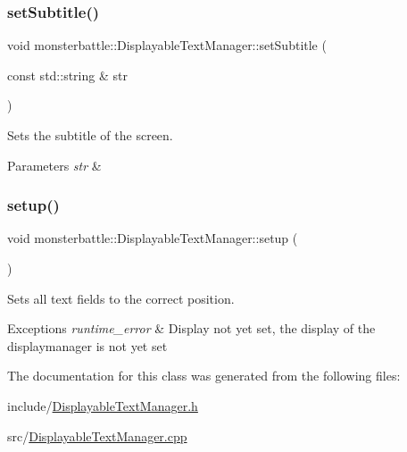 \subsubsection{\texorpdfstring{set\+Subtitle()}{setSubtitle()}}
{\footnotesize\ttfamily void monsterbattle\+::\+Displayable\+Text\+Manager\+::set\+Subtitle (\begin{DoxyParamCaption}\item[{const std\+::string \&}]{str }\end{DoxyParamCaption})}



Sets the subtitle of the screen. 


\begin{DoxyParams}{Parameters}
{\em str} & \\
\hline
\end{DoxyParams}
\mbox{\label{classmonsterbattle_1_1DisplayableTextManager_a0fc6ebabde8ca3c47728f73b76c0549f}} 
\subsubsection{\texorpdfstring{setup()}{setup()}}
{\footnotesize\ttfamily void monsterbattle\+::\+Displayable\+Text\+Manager\+::setup (\begin{DoxyParamCaption}{ }\end{DoxyParamCaption})}



Sets all text fields to the correct position. 


\begin{DoxyExceptions}{Exceptions}
{\em runtime\+\_\+error} & Display not yet set, the display of the displaymanager is not yet set \\
\hline
\end{DoxyExceptions}


The documentation for this class was generated from the following files\+:\begin{DoxyCompactItemize}
\item 
include/\hyperlink{DisplayableTextManager_8h}{Displayable\+Text\+Manager.\+h}\item 
src/\hyperlink{DisplayableTextManager_8cpp}{Displayable\+Text\+Manager.\+cpp}\end{DoxyCompactItemize}
